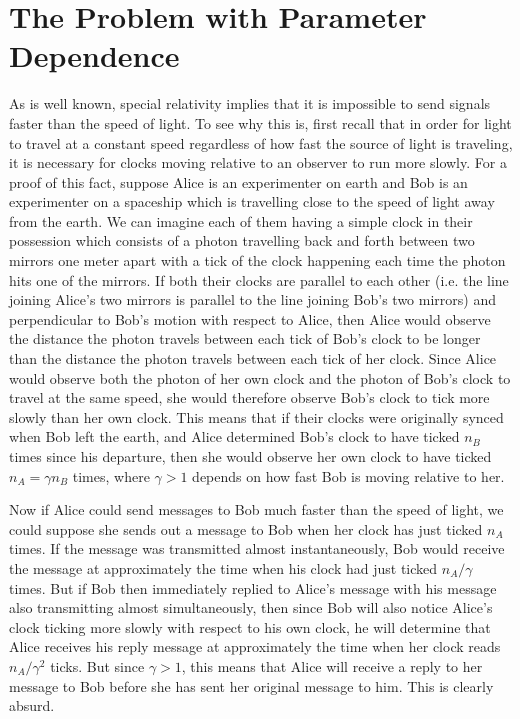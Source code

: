 \section{The Problem with Parameter Dependence\label{PDProb}}
As is well known, special relativity implies that it is impossible to send signals faster than the speed of light. To see why this is, first recall that in order for light to travel at a constant speed regardless of how fast the source of light is traveling, it is necessary for clocks moving relative to an observer to run more slowly. For a proof of this fact, suppose Alice is an experimenter on earth and Bob is an experimenter on a spaceship which is travelling close to the speed of light away from the earth. We can imagine each of them having a simple clock in their possession which consists of a photon travelling back and forth between two mirrors one meter apart with a tick of the clock happening each time the photon hits one of the mirrors.  If both their clocks are parallel to each other (i.e. the line joining Alice's two mirrors is parallel to the line joining Bob's two mirrors) and perpendicular to Bob's motion with respect to Alice, then Alice would observe the distance the photon travels between each tick of Bob's clock to be longer than the distance the photon travels between each tick of her clock. Since Alice would observe both the photon of her own clock and the photon of Bob's clock to travel at the same speed, she would therefore observe Bob's clock to tick more slowly than her own clock. This means that if their clocks were originally synced when Bob left the earth, and Alice determined Bob's clock to have ticked $n_B$ times since his departure, then she would observe her own clock to have ticked $n_A=\gamma n_B$ times, where $\gamma >1$ depends on how fast Bob is moving relative to her. 

Now if Alice could send messages to Bob much faster than the speed of light, we could suppose she sends out a message to Bob when her clock has just ticked $n_A$ times. If the message was transmitted almost instantaneously, Bob would  receive the message at approximately the time when his clock had just ticked $n_A/\gamma$ times. 
But if Bob then immediately replied to Alice's message with his message also transmitting almost simultaneously, then since Bob will also notice Alice's clock ticking more slowly with respect to his own clock, he will determine that Alice receives his reply message at approximately the time when her clock reads $n_A/\gamma^2$ ticks. But since $\gamma>1$, this means that Alice will receive a reply to her message to Bob before she has sent her original message to him. This is clearly absurd. 

